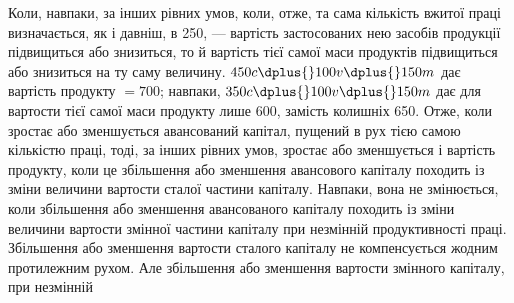 Коли, навпаки, за інших рівних умов, коли, отже, та сама кількість
вжитої праці визначається, як і давніш, в 250, — вартість застосованих нею
засобів продукції підвищиться або знизиться, то й вартість тієї самої маси продуктів
підвищиться або знизиться на ту саму величину. $450 c \dplus{} 100v \dplus{} 150  m$
дає вартість продукту $= 700$; навпаки, $350 c \dplus{} 100 v \dplus{} 150 m$ дає для вартости
тієї самої маси продукту лише 600, замість колишніх 650. Отже, коли зростає
або зменшується авансований капітал, пущений в рух тією самою кількістю
праці, тоді, за інших рівних умов, зростає або зменшується і вартість продукту,
коли це збільшення або зменшення авансового капіталу походить із зміни
величини вартости сталої частини капіталу. Навпаки, вона не змінюється, коли
збільшення або зменшення авансованого капіталу походить із зміни величини
вартости змінної частини капіталу при незмінній продуктивності праці. Збільшення
або зменшення вартости сталого капіталу не компенсується жодним протилежним
рухом. Але збільшення або зменшення вартости змінного капіталу, при незмінній
\parbreak{}  %
